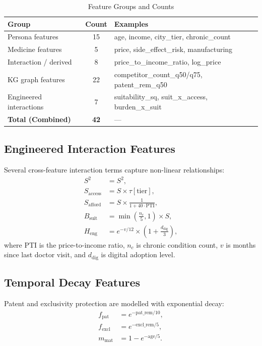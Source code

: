 \documentclass[10pt,journal,compsoc]{IEEEtran}
\begin{document}
\begin{table}[!t]
\caption{Feature Groups and Counts}
\label{tab:feature_groups}
\centering
\begin{tabular}{lcp{4.2cm}}
\toprule
\textbf{Group} & \textbf{Count} & \textbf{Examples} \\
\midrule
Persona features       & 15 & age, income, city\_tier, chronic\_count \\
Medicine features      &  5 & price, side\_effect\_risk, manufacturing \\
Interaction / derived  &  8 & price\_to\_income\_ratio, log\_price \\
KG graph features      & 22 & competitor\_count\_q50/q75, patent\_rem\_q50 \\
Engineered interactions&  7 & suitability\_sq, suit\_x\_access, burden\_x\_suit \\
\midrule
\textbf{Total (Combined)} & \textbf{42} & --- \\
\bottomrule
\end{tabular}
\end{table}

\subsection{Engineered Interaction Features}

Several cross-feature interaction terms capture non-linear relationships:
\begin{align}
  S^2 &= S^2,
  \label{eq:suit_sq}\\
  S_{\text{access}} &= S\times\tau[\text{tier}],
  \label{eq:suit_access}\\
  S_{\text{afford}} &= S\times\frac{1}{1+40\cdot\text{PTI}},
  \label{eq:suit_afford}\\
  B_{\text{suit}} &= \min\!\left(\tfrac{n_c}{5},1\right)\times S,
  \label{eq:burden_suit}\\
  H_{\text{eng}} &= e^{-v/12}\times\!\left(1+\tfrac{d_{\text{dig}}}{3}\right),
  \label{eq:health_eng}
\end{align}
where PTI is the price-to-income ratio, $n_c$ is chronic condition count,
$v$ is months since last doctor visit, and $d_{\text{dig}}$ is digital adoption level.

\subsection{Temporal Decay Features}

Patent and exclusivity protection are modelled with exponential decay:
\begin{align}
  f_{\text{pat}} &= e^{-\text{pat\_rem}/10},
  \label{eq:pat_decay}\\
  f_{\text{excl}} &= e^{-\text{excl\_rem}/5},
  \label{eq:excl_decay}\\
  m_{\text{mat}} &= 1-e^{-\text{age}/5}.
  \label{eq:market_mat}
\end{align}
\end{document}
